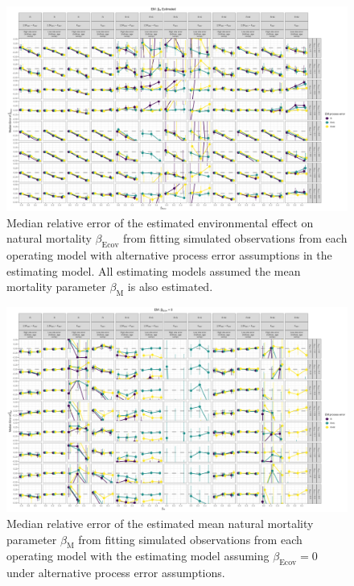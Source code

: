 \documentclass[
  12pt,
]{article}
\begin{document}
\begin{landscape}
\begin{figure}
\caption{Median relative error of the estimated environmental effect on natural mortality $\beta_\text{Ecov}$ from fitting simulated observations from each operating model with alternative process error assumptions in the estimating model. All estimating models assumed the mean mortality parameter $\beta_\text{M}$ is also estimated.}\label{Ecov_beta_bias_M_estimated}
\begin{center}
\includegraphics[height = \textheight]{Ecov_beta_bias_all_PE_effect_M_estimated.png}
\end{center}
\end{figure}
\end{landscape}

\begin{landscape}
\begin{figure}
\caption{Median relative error of the estimated mean natural mortality parameter $\beta_\text{M}$ from fitting simulated observations from each operating model with the estimating model assuming $\beta_\text{Ecov} = 0$ under alternative process error assumptions.}\label{mean_M_bias_Ecov_beta_fixed}
\begin{center}
\includegraphics[height = \textheight]{mean_M_bias_all_PE_effect_Ecov_beta_fixed.png}
\end{center}
\end{figure}
\end{landscape}
\end{document}
